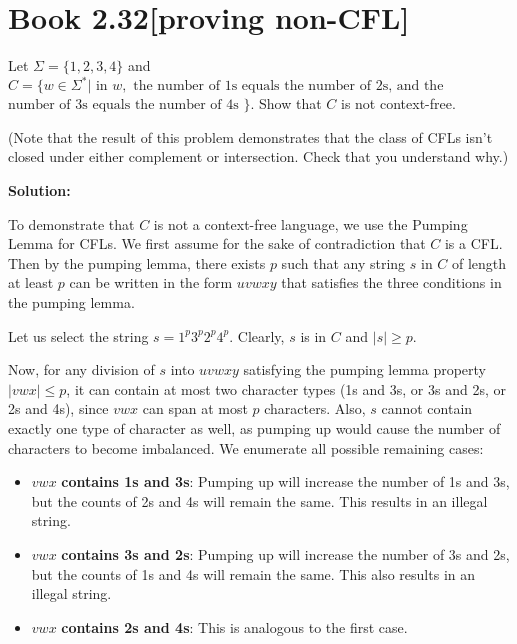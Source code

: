 \documentclass[11pt]{article}
\newenvironment{question}[2]
{\newpage\section{#1\texorpdfstring{\hfill}{horizontal spacing}{\rm\normalsize #2}}}{}
\newenvironment{solution}
{\textbf{Solution: }\color{blue}}
{\color{black}}
\begin{document}

\begin{question}{Book 2.32}{[proving non-CFL]}


Let \(\Sigma = \{1,2,3,4\}\) and \(C=\{w \in \Sigma^* | \text{ in } w, \text{ the number of 1s equals the number of 2s, and the }\) \(\text{number of 3s equals the number of 4s }\}\). Show that \(C\) is not context-free.

(Note that the result of this problem demonstrates that the class of CFLs isn’t closed under either complement or intersection. Check that you understand why.)

\begin{solution}

To demonstrate that \(C\) is not a context-free language, we use the Pumping Lemma for CFLs. We first assume for the sake of contradiction that \(C\) is a CFL. Then by the pumping lemma, there exists \(p\) such that any string \(s\) in \(C\) of length at least \(p\) can be written in the form \(uvwxy\) that satisfies the three conditions in the pumping lemma.

Let us select the string \(s = 1^p3^p2^p4^p\). Clearly, \(s\) is in \(C\) and \(|s| \geq p\).

Now, for any division of \(s\) into \(uvwxy\) satisfying the pumping lemma property \(|vwx| \leq p\), it can contain at most two character types (1s and 3s, or 3s and 2s, or 2s and 4s), since \(vwx\) can span at most \(p\) characters. Also, \(s\) cannot contain exactly one type of character as well, as pumping up would cause the number of characters to become imbalanced. We enumerate all possible remaining cases:

\begin{itemize}
    \item \(vwx\) \textbf{contains 1s and 3s}: Pumping up will increase the number of 1s and 3s, but the counts of 2s and 4s will remain the same. This results in an illegal string.
    \item \(vwx\) \textbf{contains 3s and 2s}: Pumping up will increase the number of 3s and 2s, but the counts of 1s and 4s will remain the same. This also results in an illegal string.
    \item \(vwx\) \textbf{contains 2s and 4s}: This is analogous to the first case.
\end{itemize}


\end{solution}
\end{question}
\end{document}
